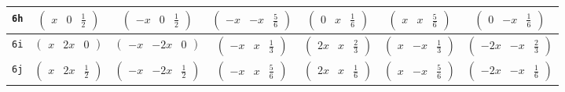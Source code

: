 \documentclass[fleqn,9pt,landscape]{jsarticle}
\begin{document}
\begin{center}
\begin{longtable}{ccccccc}
{\tt 6h} & $ \begin{pmatrix} x & 0 & \frac{1}{2} \end{pmatrix} $ & $ \begin{pmatrix} - x & 0 & \frac{1}{2} \end{pmatrix} $ & $ \begin{pmatrix} - x & - x & \frac{5}{6} \end{pmatrix} $ & $ \begin{pmatrix} 0 & x & \frac{1}{6} \end{pmatrix} $ & $ \begin{pmatrix} x & x & \frac{5}{6} \end{pmatrix} $ & $ \begin{pmatrix} 0 & - x & \frac{1}{6} \end{pmatrix} $ \\ \hline
{\tt 6i} & $ \begin{pmatrix} x & 2 x & 0 \end{pmatrix} $ & $ \begin{pmatrix} - x & - 2 x & 0 \end{pmatrix} $ & $ \begin{pmatrix} - x & x & \frac{1}{3} \end{pmatrix} $ & $ \begin{pmatrix} 2 x & x & \frac{2}{3} \end{pmatrix} $ & $ \begin{pmatrix} x & - x & \frac{1}{3} \end{pmatrix} $ & $ \begin{pmatrix} - 2 x & - x & \frac{2}{3} \end{pmatrix} $ \\ \hline
{\tt 6j} & $ \begin{pmatrix} x & 2 x & \frac{1}{2} \end{pmatrix} $ & $ \begin{pmatrix} - x & - 2 x & \frac{1}{2} \end{pmatrix} $ & $ \begin{pmatrix} - x & x & \frac{5}{6} \end{pmatrix} $ & $ \begin{pmatrix} 2 x & x & \frac{1}{6} \end{pmatrix} $ & $ \begin{pmatrix} x & - x & \frac{5}{6} \end{pmatrix} $ & $ \begin{pmatrix} - 2 x & - x & \frac{1}{6} \end{pmatrix} $ \\ \hline

\end{longtable}
\end{center}
\end{document}
